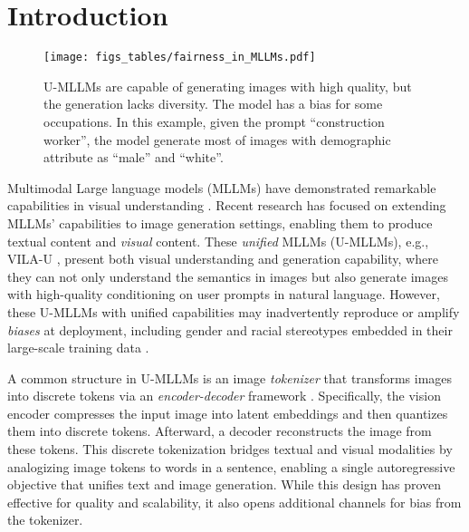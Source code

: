 \vspace{-3em}
\section{Introduction}
\label{sec:intro}
 
\begin{figure}[ht]
    \centering
    \texttt{[image: figs\_tables/fairness\_in\_MLLMs.pdf]}
    \vspace{-0.5cm}
    \caption{U-MLLMs are capable of generating images with high quality, but the generation lacks diversity. The model has a bias for some occupations. In this example, given the prompt ``construction worker'', the model generate most of images with demographic attribute as ``male'' and ``white''.}
    \label{fig:fairness-mllms}
    \vspace{-0.75cm}
\end{figure}


Multimodal Large language models (MLLMs) have demonstrated remarkable capabilities in visual understanding \cite{li2024llava, wang2024qwen2vlenhancingvisionlanguagemodels}. Recent research \cite{wu2024vila,  wu2024janus} has focused on extending MLLMs' capabilities to image generation settings, enabling them to produce textual content and \emph{visual} content. These \emph{unified} MLLMs (U-MLLMs), e.g., VILA-U \cite{wu2024vila}, present both visual understanding and generation capability, where they can not only understand the semantics in images but also generate images with high-quality conditioning on user prompts in natural language. However, these U-MLLMs with unified capabilities may inadvertently reproduce or amplify \emph{biases} at deployment, including gender and racial stereotypes embedded in their large-scale training data \cite{elazar2023s,chen2024catastrophic}. 

A common structure in U-MLLMs is an image \emph{tokenizer} that transforms images into discrete tokens via an \emph{encoder-decoder} framework \cite{esser2021taming}. Specifically, the vision encoder compresses the input image into latent embeddings and then quantizes them into discrete tokens. Afterward, a decoder reconstructs the image from these tokens. This discrete tokenization bridges textual and visual modalities by analogizing image tokens to words in a sentence, enabling a single autoregressive objective that unifies text and image generation. While this design has proven effective for quality and scalability, it also opens additional channels for bias from the tokenizer.


